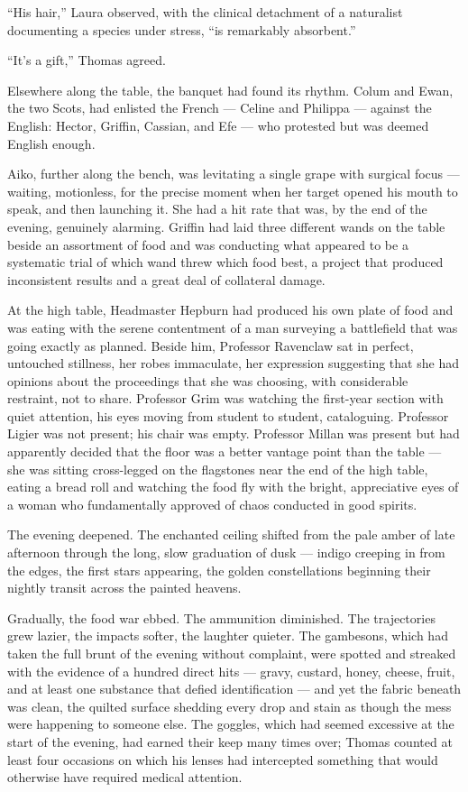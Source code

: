 \enquote{His hair,} Laura observed, with the clinical detachment of a naturalist documenting a species under stress, \enquote{is remarkably absorbent.}
 
\enquote{It's a gift,} Thomas agreed.
 
Elsewhere along the table, the banquet had found its rhythm. Colum and Ewan, the two Scots, had enlisted the French — Celine and Philippa — against the English: Hector, Griffin, Cassian, and Efe — who protested but was deemed English enough.
 
Aiko, further along the bench, was levitating a single grape with surgical focus --- waiting, motionless, for the precise moment when her target opened his mouth to speak, and then launching it. She had a hit rate that was, by the end of the evening, genuinely alarming. Griffin had laid three different wands on the table beside an assortment of food and was conducting what appeared to be a systematic trial of which wand threw which food best, a project that produced inconsistent results and a great deal of collateral damage.
 
At the high table, Headmaster Hepburn had produced his own plate of food and was eating with the serene contentment of a man surveying a battlefield that was going exactly as planned. Beside him, Professor Ravenclaw sat in perfect, untouched stillness, her robes immaculate, her expression suggesting that she had opinions about the proceedings that she was choosing, with considerable restraint, not to share. Professor Grim was watching the first-year section with quiet attention, his eyes moving from student to student, cataloguing. Professor Ligier was not present; his chair was empty. Professor Millan was present but had apparently decided that the floor was a better vantage point than the table --- she was sitting cross-legged on the flagstones near the end of the high table, eating a bread roll and watching the food fly with the bright, appreciative eyes of a woman who fundamentally approved of chaos conducted in good spirits.
 
The evening deepened. The enchanted ceiling shifted from the pale amber of late afternoon through the long, slow graduation of dusk --- indigo creeping in from the edges, the first stars appearing, the golden constellations beginning their nightly transit across the painted heavens.
 
Gradually, the food war ebbed. The ammunition diminished. The trajectories grew lazier, the impacts softer, the laughter quieter. The gambesons, which had taken the full brunt of the evening without complaint, were spotted and streaked with the evidence of a hundred direct hits --- gravy, custard, honey, cheese, fruit, and at least one substance that defied identification --- and yet the fabric beneath was clean, the quilted surface shedding every drop and stain as though the mess were happening to someone else. The goggles, which had seemed excessive at the start of the evening, had earned their keep many times over; Thomas counted at least four occasions on which his lenses had intercepted something that would otherwise have required medical attention.
 

